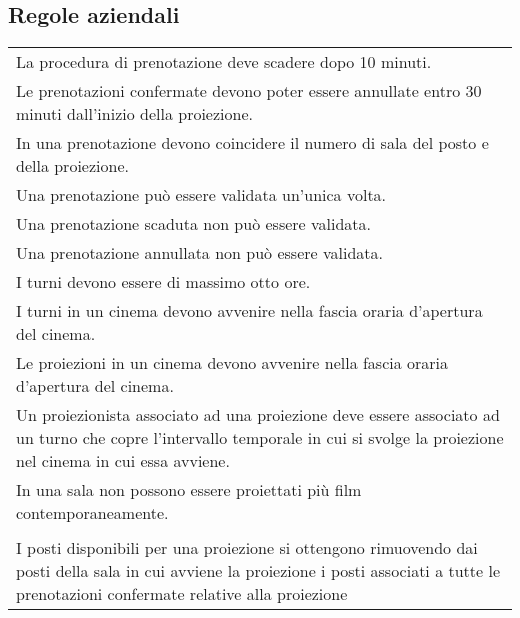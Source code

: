 \subsection*{Regole aziendali}
%
%
\begin{longtable}{|p{16.75cm}|}
    \hline
    \rowcolor{tblhdrcolor}
    \multicolumn{1}{|c|}{\textbf{Regole di vincolo}}
    \\\hline
    La procedura di prenotazione deve scadere dopo 10 minuti. \\\hline
    Le prenotazioni confermate devono poter essere annullate entro 30 minuti
    dall'inizio della proiezione.                             \\\hline
    In una prenotazione devono coincidere il numero di sala del posto
    e della proiezione.                                       \\\hline
    Una prenotazione può essere validata un'unica volta.      \\\hline
    Una prenotazione scaduta non può essere validata.         \\\hline
    Una prenotazione annullata non può essere validata.       \\\hline
    I turni devono essere di massimo otto ore.                \\\hline
    I turni in un cinema devono avvenire nella fascia oraria d'apertura
    del cinema.                                               \\\hline
    Le proiezioni in un cinema devono avvenire nella fascia oraria d'apertura
    del cinema.                                               \\\hline
    Un proiezionista associato ad una proiezione deve essere associato
    ad un turno che copre l'intervallo temporale in cui si svolge la proiezione
    nel cinema in cui essa avviene.                           \\\hline
    In una sala non possono essere proiettati più film contemporaneamente.
    \\ \hline
    \rowcolor{tblhdrcolor}
    \multicolumn{1}{|c|}{\textbf{Regole di derivazione}}
    \\\hline
    I posti disponibili per una proiezione si ottengono rimuovendo dai posti
    della sala in cui avviene la proiezione i posti associati a tutte le
    prenotazioni confermate relative alla proiezione
    \\ \hline
\end{longtable}


